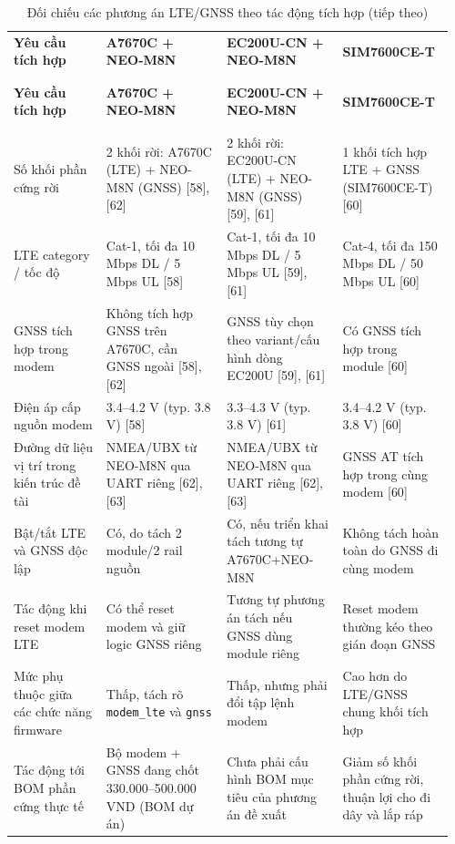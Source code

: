 \documentclass[a4paper]{extarticle}
\newcommand{\thesissettableid}[2]{%
  \renewcommand{\thetable}{#1}%
  \renewcommand{\theHtable}{#2}%
}
\begin{document}
{\thesissettableid{3.3}{tab-ch3-oi-chieu-cac-phuong-an-lte-gnss-theo-tac-ong-tich-hop}
\def\LTcaptype{table}
\begin{longtable}{|L{0.202\linewidth}|L{0.260\linewidth}|L{0.252\linewidth}|L{0.241\linewidth}|}
\caption{Đối chiếu các phương án LTE/GNSS theo tác động tích hợp}\label{tab:ch3-oi-chieu-cac-phuong-an-lte-gnss-theo-tac-ong-tich-hop}\\
\hline \textbf{Yêu cầu tích hợp} & \textbf{A7670C + NEO-M8N} & \textbf{EC200U-CN + NEO-M8N} & \textbf{SIM7600CE-T} \\
\\\hline
\endfirsthead
\caption[]{Đối chiếu các phương án LTE/GNSS theo tác động tích hợp (tiếp theo)}\\
\hline \textbf{Yêu cầu tích hợp} & \textbf{A7670C + NEO-M8N} & \textbf{EC200U-CN + NEO-M8N} & \textbf{SIM7600CE-T} \\
\\\hline
\endhead
\\\hline
\endfoot
\endlastfoot
Số khối phần cứng rời & 2 khối rời: A7670C (LTE) + NEO-M8N (GNSS)
{[}58{]}, {[}62{]} & 2 khối rời: EC200U-CN (LTE) + NEO-M8N (GNSS)
{[}59{]}, {[}61{]} & 1 khối tích hợp LTE + GNSS (SIM7600CE-T) {[}60{]} \\\hline
LTE category / tốc độ & Cat-1, tối đa 10 Mbps DL / 5 Mbps UL {[}58{]} &
Cat-1, tối đa 10 Mbps DL / 5 Mbps UL {[}59{]}, {[}61{]} & Cat-4, tối đa
150 Mbps DL / 50 Mbps UL {[}60{]} \\\hline
GNSS tích hợp trong modem & Không tích hợp GNSS trên A7670C, cần GNSS
ngoài {[}58{]}, {[}62{]} & GNSS tùy chọn theo variant/cấu hình dòng
EC200U {[}59{]}, {[}61{]} & Có GNSS tích hợp trong module {[}60{]} \\\hline
Điện áp cấp nguồn modem & 3.4--4.2 V (typ. 3.8 V) {[}58{]} & 3.3--4.3 V
(typ. 3.8 V) {[}61{]} & 3.4--4.2 V (typ. 3.8 V) {[}60{]} \\\hline
Đường dữ liệu vị trí trong kiến trúc đề tài & NMEA/UBX từ NEO-M8N qua
UART riêng {[}62{]}, {[}63{]} & NMEA/UBX từ NEO-M8N qua UART riêng
{[}62{]}, {[}63{]} & GNSS AT tích hợp trong cùng modem {[}60{]} \\\hline
Bật/tắt LTE và GNSS độc lập & Có, do tách 2 module/2 rail nguồn & Có,
nếu triển khai tách tương tự A7670C+NEO-M8N & Không tách hoàn toàn do
GNSS đi cùng modem \\\hline
Tác động khi reset modem LTE & Có thể reset modem và giữ logic GNSS
riêng & Tương tự phương án tách nếu GNSS dùng module riêng & Reset modem
thường kéo theo gián đoạn GNSS \\\hline
Mức phụ thuộc giữa các chức năng firmware & Thấp, tách rõ
\texttt{modem\_lte} và \texttt{gnss} & Thấp, nhưng phải đổi tập lệnh
modem & Cao hơn do LTE/GNSS chung khối tích hợp \\\hline
Tác động tới BOM phần cứng thực tế & Bộ modem + GNSS đang chốt
330.000--500.000 VND (BOM dự án) & Chưa phải cấu hình BOM mục tiêu của phương án đề xuất
& Giảm số khối phần cứng rời, thuận lợi cho đi dây và lắp ráp \\\hline
\end{longtable}
}
\end{document}

